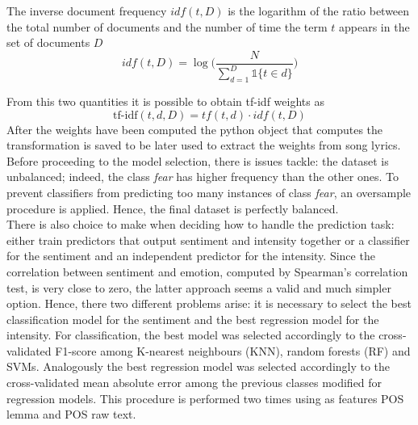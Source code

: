 \documentclass[runningheads]{llncs}
\begin{document}
The inverse document frequency $idf(t,D)$ is the logarithm of the ratio between the total number of documents and the number of time the term $t$ appears in the set of documents $D$
\begin{equation}
    idf(t,D) = \log \biggl ( \frac{N}{\sum_{d=1}^{D} \mathds{1}\{t \in d\}} \biggr )
\end{equation}

From this two quantities it is possible to obtain tf-idf weights as
\begin{equation}
    \text{tf-idf}(t,d,D) = tf(t,d) \cdot idf(t,D)
\end{equation}
After the weights have been computed the python object that computes the transformation is saved to be later used to extract the weights from song lyrics. \\

Before proceeding to the model selection, there is issues tackle: the dataset is unbalanced; indeed, the class \textit{fear} has higher frequency than the other ones. To prevent classifiers from predicting too many instances of class \textit{fear}, an oversample procedure is applied. Hence, the final dataset is perfectly balanced. \\
There is also choice to make when deciding how to handle the prediction task: either train predictors that output sentiment and intensity together or a  classifier for the sentiment and an independent predictor for the intensity. Since the correlation between sentiment and emotion, computed by Spearman's correlation test, is very close to zero, the latter approach seems a valid and much simpler option. Hence, there two different problems arise: it is necessary to select the best classification model for the sentiment and the best regression model for the intensity. For classification, the best model was selected accordingly to the cross-validated F1-score among K-nearest neighbours (KNN), random forests (RF) and SVMs. Analogously the best regression model was selected accordingly to the cross-validated mean absolute error among the previous classes modified for regression models. This procedure is performed two times using as features POS lemma and POS raw text. 
\end{document}
